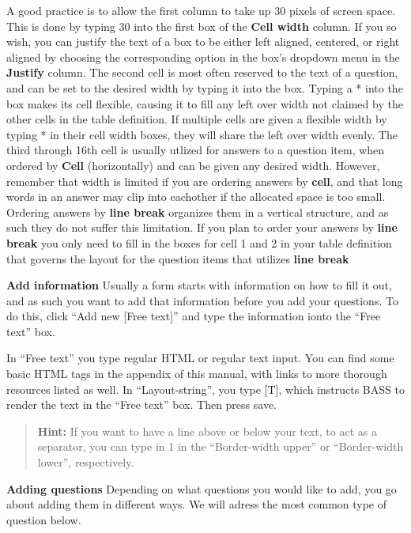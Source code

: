 \documentclass[]{book}
\begin{document}
A good practice is to allow the first column to take up 30 pixels of screen space. This is done by typing 30 into the first box of the \textbf{Cell width} column. If you so wish, you can justify the text of a box to be either left aligned, centered, or right aligned by choosing the corresponding option in the box's dropdown menu in the \textbf{Justify} column.
The second cell is most often reserved to the text of a question, and can be set to the desired width by typing it into the box.
Typing a * into the box makes its cell flexible, causing it to fill any left over width not claimed by the other cells in the table definition. If multiple cells are given a flexible width by typing * in their cell width boxes, they will share the left over width evenly.
The third through 16th cell is usually utlized for answers to a question item, when ordered by \textbf{Cell} (horizontally) and can be given any desired width. However, remember that width is limited if you are ordering answers by \textbf{cell}, and that long words in an answer may clip into eachother if the allocated space is too small.
Ordering answers by \textbf{line break} organizes them in a vertical structure, and as such they do not suffer this limitation. If you plan to order your answers by \textbf{line break} you only need to fill in the boxes for cell 1 and 2 in your table definition that governs the layout for the question items that utilizes \textbf{line break}

\textbf{Add information}
Usually a form starts with information on how to fill it out, and as such you want to add that information before you add your questions. To do this, click ``Add new {[}Free text{]}'' and type the information ionto the ``Free text'' box.

In ``Free text'' you type regular HTML or regular text input. You can find some basic HTML tags in the appendix of this manual, with links to more thorough resources listed as well.
In ``Layout-string'', you type {[}T{]}, which instructs BASS to render the text in the ``Free text'' box. Then press save.

\begin{quote}
\textbf{Hint:} If you want to have a line above or below your text, to act as a separator, you can type in 1 in the ``Border-width upper'' or ``Border-width lower'', respectively.
\end{quote}

\textbf{Adding questions}
Depending on what questions you would like to add, you go about adding them in different ways. We will adress the most common type of question below.
\end{document}

